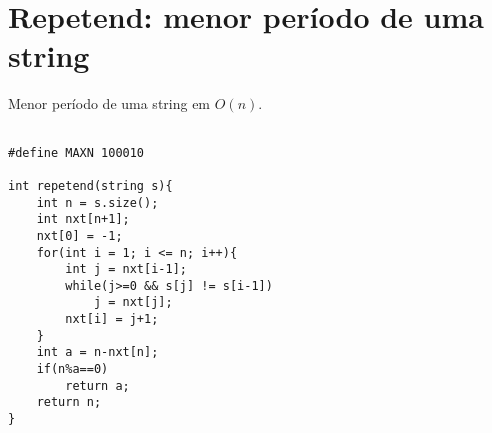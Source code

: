 \section{Repetend: menor período de uma string}

Menor período de uma string em $O(n)$.

\begin{multicols}{2}
	\begin{lstlisting}

#define MAXN 100010

int repetend(string s){
	int n = s.size();
	int nxt[n+1];
	nxt[0] = -1;
	for(int i = 1; i <= n; i++){
		int j = nxt[i-1];
		while(j>=0 && s[j] != s[i-1])
			j = nxt[j];
		nxt[i] = j+1;
	}
	int a = n-nxt[n];
	if(n%a==0)
		return a;
	return n;	
}

\end{lstlisting}
\end{multicols}


